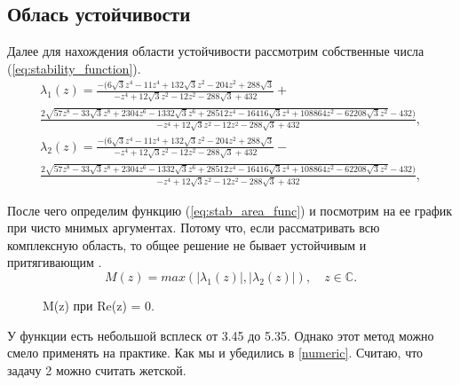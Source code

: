 \documentclass[a4paper,article,14pt]{extarticle}
\begin{document}
\subsection{Облась устойчивости}
Далее для нахождения области устойчивости рассмотрим собственные числа (\ref{eq:stability_function}).
{\footnotesize
\begin{equation}
\begin{gathered}
    \lambda_{1}(z) = \frac{-(6 \sqrt{3} z^{4} - 11 z^{4} + 132 \sqrt{3} z^{2} - 204 z^{2} + 288 \sqrt{3}}{-z^{4} + 12 \sqrt{3} z^{2} - 12 z^{2} - 288 \sqrt{3} + 432} + \\ 
\frac{2 \sqrt{57 z^8 - 33 \sqrt{3} z^8 + 2304 z^{6} - 1332 \sqrt{3} z^{6} + 28512 z^{4} - 16416  \sqrt{3} z^{4} + 108864 z^{2} - 62208 \sqrt{3} z^{2}} - 432)}{-z^{4} + 12 \sqrt{3} z^{2} - 12 z^{2} - 288 \sqrt{3} + 432}, \\
    \lambda_{2}(z) = \frac{-(6 \sqrt{3} z^{4} - 11 z^{4} + 132 \sqrt{3} z^{2} - 204 z^{2} + 288 \sqrt{3}}{-z^{4} + 12 \sqrt{3} z^{2} - 12 z^{2} - 288 \sqrt{3} + 432} - \\ 
\frac{2 \sqrt{57 z^{8} - 33 \sqrt{3} z^{8} + 2304 z^{6} - 1332 \sqrt{3} z^{6} + 28512 z^{4} - 16416 \sqrt{3} z^{4} + 108864 z^{2} - 62208 \sqrt{3} z^{2}} - 432)}{-z^{4} + 12 \sqrt{3} z^{2} - 12 z^{2} - 288 \sqrt{3} + 432},
\end{gathered}
\end{equation}}

После чего определим функцию (\ref{eq:stab_area_func}) и посмотрим на ее график при чисто мнимых аргументах. Потому что, если рассматривать всю комплексную область, то общее решение не бывает устойчивым и притягивающим \cite{stability}.
\begin{equation}
    M(z) = max(\lvert \lambda_{1}(z) \rvert, \lvert \lambda_{2}(z) \rvert), \quad z \in \mathbb{C}.
\label{eq:stab_area_func}
\end{equation}

\begin{figure}[ht]
\begin{center}
\caption{
\label{stab_area}
     M(z) при Re(z) = 0.}
\end{center}
\end{figure}
У функции есть небольшой всплеск от 3.45 до 5.35. Однако этот метод можно смело применять на практике. Как мы и убедились в \ref{numeric}. Считаю, что задачу 2 можно считать жетской.
\end{document}
